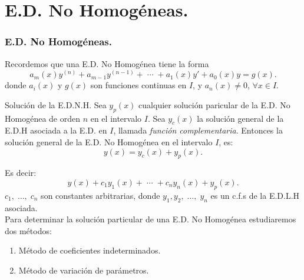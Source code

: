 \documentclass{beamer}
\begin{document}
\frame{\titlepage}

\section{E.D. No Homogéneas.} %
\begin{frame}[t]
	\frametitle{E.D. No Homogéneas.}
	\begin{block}{}
		Recordemos que una E.D. No Homogénea tiene la forma
		\[
			a_m(x) y^{(n)}+a_{m-1} y^{(n-1)} + \;\cdots\; + a_1(x) y' + a_0(x) y = g(x) .
		\]
		donde \(a_i(x)\) y \(g(x)\) son funciones continuas en \(I\), y \(a_n(x) \ne 0\), \(\forall x \in I\).
	\end{block}
	\begin{block}{Solución de la E.D.N.H.}
		Sea \(y_p(x)\) cualquier solución paricular de la E.D. No Homogénea de orden \(n\) en el intervalo \(I\). Sea \(y_c(x)\) la solución general de la E.D.H asociada a la E.D. en \(I\), llamada \textit{función complementaria}. Entonces la solución general de la E.D. No Homogénea en el intervalo \(I\), es:
		\[
			y(x) = y_c(x) + y_p(x).
		\]
	\end{block}
\end{frame}

\begin{frame}[t]
	\begin{block}{}
		Es decir:
		\[
			y(x) +c_1y_1(x) + \;\cdots\; + c_ny_n(x) + y_p(x).
		\]
		\(c_1, \;\ldots,\; c_n\) son constantes arbitrarias, donde \(y_1,y_2, \;\ldots,\; y_n\) es un c.f.s de la E.D.L.H asociada. \\[2mm]
		Para determinar la solución particular de una E.D. No Homogénea estudiaremos dos métodos:
		\begin{enumerate}
			\item Método de coeficientes indeterminados.
			\item Método de variación de parámetros.
		\end{enumerate}
	\end{block}
\end{frame}
\end{document}
